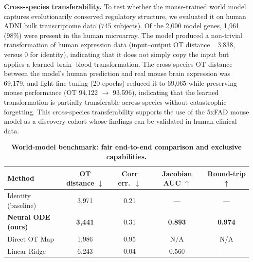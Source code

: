 \documentclass[12pt,a4paper]{article}
\begin{document}
\textbf{Cross-species transferability.}
To test whether the mouse-trained world model captures evolutionarily conserved regulatory structure, we evaluated it on human ADNI bulk transcriptome data (745 subjects). Of the 2{,}000 model genes, 1{,}961 (98\%) were present in the human microarray. The model produced a non-trivial transformation of human expression data (input--output OT distance\,=\,3{,}838, versus 0 for identity), indicating that it does not simply copy the input but applies a learned brain--blood transformation. The cross-species OT distance between the model's human prediction and real mouse brain expression was 69{,}179, and light fine-tuning (20 epochs) reduced it to 69{,}065 while preserving mouse performance (OT 94{,}122 $\rightarrow$ 93{,}596), indicating that the learned transformation is partially transferable across species without catastrophic forgetting. This cross-species transferability supports the use of the 5xFAD mouse model as a discovery cohort whose findings can be validated in human clinical data.

\begin{table}[htbp]
\centering\small
\caption{\textbf{World-model benchmark: fair end-to-end comparison and exclusive capabilities.}}
\label{tab:benchmark}
\begin{tabular}{lcccc}
\hline
Method & OT distance $\downarrow$ & Corr err.\ $\downarrow$ & Jacobian AUC $\uparrow$ & Round-trip $\uparrow$ \\
\hline
Identity (baseline) & 3{,}971 & 0.21 & --- & --- \\
\textbf{Neural ODE (ours)} & \textbf{3{,}441} & 0.31 & \textbf{0.893} & \textbf{0.974} \\
Direct OT Map & 1{,}986 & 0.95 & N/A & N/A \\
Linear Ridge & 6{,}243 & 0.04 & 0.560 & --- \\
\hline
\end{tabular}
\end{table}
\end{document}

